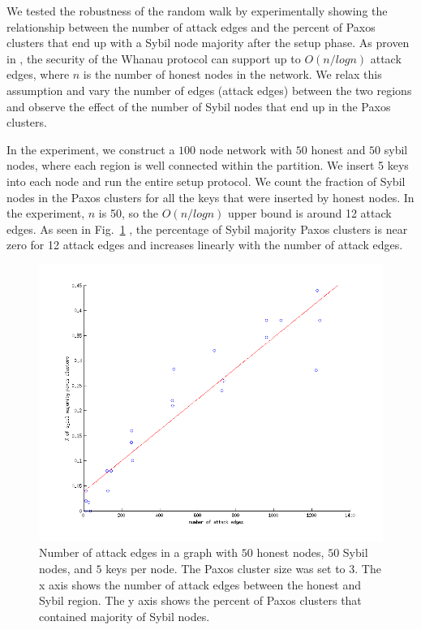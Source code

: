\documentclass[letter]{article}
\begin{document}
We tested the robustness of the random walk by experimentally showing the relationship between the number
of attack edges and the percent of Paxos clusters that end up with a Sybil node majority after the setup phase.
As proven in \cite{Whanau}, the security of the Whanau protocol can support
up to $O(n/logn)$ attack edges, where $n$ is the number of honest nodes in the network.
We relax this assumption and vary the number of edges (attack edges) between the two regions
and observe the effect of the number of Sybil nodes that end up in the Paxos clusters.

In the experiment, we construct a $100$ node network with $50$ honest and $50$ sybil nodes, where each region is well connected within the partition.
We insert 5 keys into each node and run the entire setup protocol. We count the fraction of
Sybil nodes in the Paxos clusters for all the keys that were inserted by honest nodes.
In the experiment, $n$ is 50, so the $O(n/logn)$ upper bound is around 12 attack edges.
As seen in Fig.~\ref{fig:sybilcluster-3} , the percentage of Sybil majority Paxos clusters is near zero for 12 attack edges
and increases linearly with the number of attack edges.

\begin{figure}[h]
\centering
\includegraphics[width=1.0\columnwidth]{sybilcluster-3}
\caption{Number of attack edges in a graph with $50$ honest nodes, $50$ Sybil nodes, and $5$ keys per node. The Paxos cluster size was set to $3$.
The x axis shows the number of attack edges between the honest and Sybil region. The y axis shows the percent of Paxos clusters that contained
majority of Sybil nodes.}
\label{fig:sybilcluster-3}
\end{figure}
\end{document}
